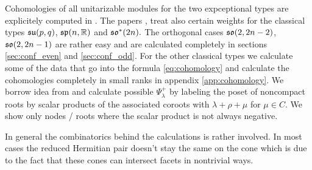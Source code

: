 Cohomologies of all unitarizable modules for the two expceptional types are explicitely computed in \cite{enright_resolutions_2004-1}. The papers \cite{enright_hilbert_2004}, \cite{enright_resolutions_2004} treat also certain weights for the classical types $\mathfrak{su}(p,q)$, $\mathfrak{sp}(n,\mathbb{R})$ and $\mathfrak{so}^*(2n).$  The orthogonal cases $\mathfrak{so}(2,2n-2)$, $\mathfrak{so}(2,2n-1)$ are rather easy and are calculated completely in sections \ref{sec:conf_even} and \ref{sec:conf_odd}. For the other classical types we calculate some of the data that go into the formula \eqref{eq:cohomology} and calculate the cohomologies completely in small ranks in appendix \ref{app:cohomology}. We borrow idea from \cite{enright_resolutions_2004-1} and calculate possible $\Psi_\lambda^+ $ by labeling the poset of noncompact roots by scalar products of the associated coroots with $\lambda + \rho + \mu$ for $\mu \in C$. We show only nodes / roots where the scalar product is not always negative. 

In general the combinatorics behind the calculations is rather involved. In most cases the reduced Hermitian pair doesn't stay the same on the cone which is due to the fact that these cones can intersect facets in nontrivial ways. 

